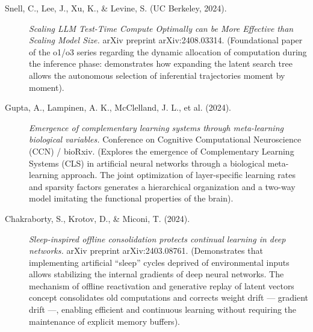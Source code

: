 \documentclass[11pt,a4paper,oneside]{article} %
\begin{document}
\hypertarget{a1.4-dynamic-compute-allocation-and-test-time-compute}{%
\label{a1.4-dynamic-compute-allocation-and-test-time-compute}}

\begin{description}
\item[Snell, C., Lee, J., Xu, K., \& Levine, S. (UC Berkeley, 2024).] \emph{Scaling LLM Test-Time Compute Optimally can be More Effective than Scaling Model Size.} arXiv preprint arXiv:2408.03314. (Foundational paper of the o1/o3 series regarding the dynamic allocation of computation during the inference phase: demonstrates how expanding the latent search tree allows the autonomous selection of inferential trajectories moment by moment).
\end{description}

\hypertarget{a1.5-recursive-meta-learning-and-synthetic-cls-architectures}{%
\label{a1.5-recursive-meta-learning-and-synthetic-cls-architectures}}

\begin{description}
\item[Gupta, A., Lampinen, A. K., McClelland, J. L., et al. (2024).] \emph{Emergence of complementary learning systems through meta-learning biological variables.} Conference on Cognitive Computational Neuroscience (CCN) / bioRxiv. (Explores the emergence of Complementary Learning Systems (CLS) in artificial neural networks through a biological meta-learning approach. The joint optimization of layer-specific learning rates and sparsity factors generates a hierarchical organization and a two-way model imitating the functional properties of the brain).

\item[Chakraborty, S., Krotov, D., \& Miconi, T. (2024).] \emph{Sleep-inspired offline consolidation protects continual learning in deep networks.} arXiv preprint arXiv:2403.08761. (Demonstrates that implementing artificial ``sleep'' cycles deprived of environmental inputs allows stabilizing the internal gradients of deep neural networks. The mechanism of offline reactivation and generative replay of latent vectors concept consolidates old computations and corrects weight drift --- gradient drift ---, enabling efficient and continuous learning without requiring the maintenance of explicit memory buffers).
\end{description}
\end{document}
